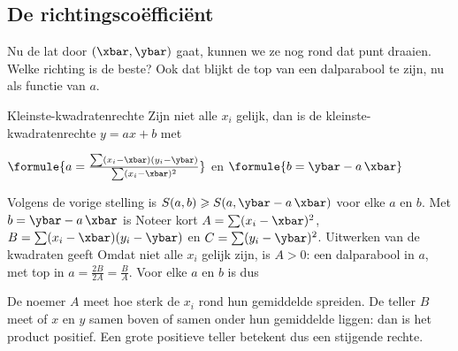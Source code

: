 \begin{oefeningen}
\end{oefeningen}

\subsection{De richtingscoëfficiënt}

Nu de lat door $(\xbar, \ybar)$ gaat, kunnen we ze nog rond dat punt draaien. Welke richting is de beste? Ook dat blijkt de top van een dalparabool te zijn, nu als functie van $a$.

\begin{theorie}
\begin{stelling}{Kleinste-kwadratenrechte}
Zijn niet alle $x_i$ gelijk, dan is de kleinste-kwadratenrechte $y = ax + b$ met

\vspace{1mm}
\qquad $\formule{a = \frac{\sum (x_i - \xbar)(y_i - \ybar)}{\sum (x_i - \xbar)^2}}$ \qquad en \qquad $\formule{b = \ybar - a\,\xbar}$
\end{stelling}

\begin{bewijs}
Volgens de vorige stelling is $S(a, b) \geqslant S(a, \ybar - a\,\xbar)$ voor elke $a$ en $b$. Met $b = \ybar - a\,\xbar$ is
Noteer kort $A = \sum (x_i - \xbar)^2$, $B = \sum (x_i - \xbar)(y_i - \ybar)$ en $C = \sum (y_i - \ybar)^2$. Uitwerken van de kwadraten geeft
Omdat niet alle $x_i$ gelijk zijn, is $A > 0$: een dalparabool in $a$, met top in $a = \frac{2B}{2A} = \frac{B}{A}$. Voor elke $a$ en $b$ is dus
\end{bewijs}
\end{theorie}

De noemer $A$ meet hoe sterk de $x_i$ rond hun gemiddelde spreiden. De teller $B$ meet of $x$ en $y$ samen boven of samen onder hun gemiddelde liggen: dan is het product positief. Een grote positieve teller betekent dus een stijgende rechte.

